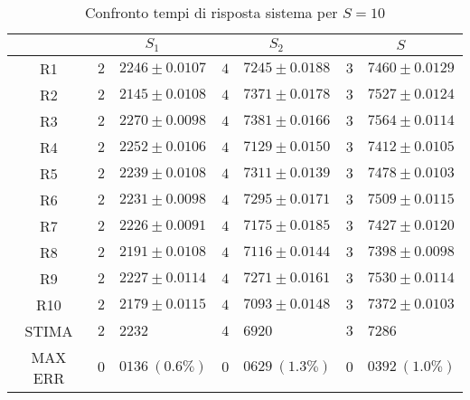 \begin{table}[!h]
\begin{tabular}{c|r@{.}l|r@{.}l|r@{.}l}
& \multicolumn{2}{|c|}{$S_1$}
& \multicolumn{2}{|c|}{$S_2$}
& \multicolumn{2}{|c}{$S$} 
\\          
\hline
R1      & $2$&$2246 \pm 0.0107$ & $4$&$7245 \pm 0.0188$ & $3$&$7460 \pm 0.0129$ \\
R2      & $2$&$2145 \pm 0.0108$ & $4$&$7371 \pm 0.0178$ & $3$&$7527 \pm 0.0124$ \\
R3      & $2$&$2270 \pm 0.0098$ & $4$&$7381 \pm 0.0166$ & $3$&$7564 \pm 0.0114$ \\
R4      & $2$&$2252 \pm 0.0106$ & $4$&$7129 \pm 0.0150$ & $3$&$7412 \pm 0.0105$ \\
R5      & $2$&$2239 \pm 0.0108$ & $4$&$7311 \pm 0.0139$ & $3$&$7478 \pm 0.0103$ \\
R6      & $2$&$2231 \pm 0.0098$ & $4$&$7295 \pm 0.0171$ & $3$&$7509 \pm 0.0115$ \\
R7      & $2$&$2226 \pm 0.0091$ & $4$&$7175 \pm 0.0185$ & $3$&$7427 \pm 0.0120$ \\
R8      & $2$&$2191 \pm 0.0108$ & $4$&$7116 \pm 0.0144$ & $3$&$7398 \pm 0.0098$ \\
R9      & $2$&$2227 \pm 0.0114$ & $4$&$7271 \pm 0.0161$ & $3$&$7530 \pm 0.0114$ \\
R10     & $2$&$2179 \pm 0.0115$ & $4$&$7093 \pm 0.0148$ & $3$&$7372 \pm 0.0103$ \\
STIMA   & $2$&$2232$            & $4$&$6920$            & $3$&$7286$            \\
MAX ERR & $0$&$0136 \ (0.6\%)$  & $0$&$0629 \ (1.3\%)$  & $0$&$0392 \ (1.0\%)$    
\end{tabular}
\centering
\caption{Confronto tempi di risposta sistema per $S=10$}
\label{tab:10_s}
\end{table}
